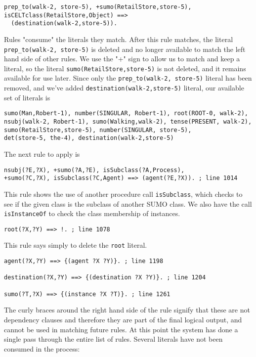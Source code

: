 \documentclass{book}
\begin{document}
\begin{verbatim}
prep_to(walk-2, store-5), +sumo(RetailStore,store-5), 
isCELTclass(RetailStore,Object) ==> 
  (destination(walk-2,store-5)). 
\end{verbatim}

Rules "consume" the literals they match.  After this rule matches, the literal
\texttt{prep\_to(walk-2, store-5)} is deleted and no longer available to 
match the left hand side of other rules.  We use the "+" sign to allow us
to match and keep a literal, so the literal \texttt{sumo(RetailStore,store-5)} 
is not deleted, and it remains available for use later.  Since only the
\texttt{prep\_to(walk-2, store-5)} literal
has been removed, and we've added \texttt{destination(walk-2,store-5)} literal,
our available set of literals is

\begin{verbatim}
sumo(Man,Robert-1), number(SINGULAR, Robert-1), root(ROOT-0, walk-2), 
nsubj(walk-2, Robert-1), sumo(Walking,walk-2), tense(PRESENT, walk-2), 
sumo(RetailStore,store-5), number(SINGULAR, store-5), 
det(store-5, the-4), destination(walk-2,store-5)
\end{verbatim}

The next rule to apply is 

\begin{verbatim}
nsubj(?E,?X), +sumo(?A,?E), isSubclass(?A,Process), 
+sumo(?C,?X), isSubclass(?C,Agent) ==> (agent(?E,?X)). ; line 1014
\end{verbatim}

This rule shows the use of another procedure call \texttt{isSubclass},
which checks to see if the given class is the subclass of another
SUMO class.  We also have the call \texttt{isInstanceOf} to check the class 
membership of instances.
 
\begin{verbatim}
root(?X,?Y) ==> !. ; line 1078
\end{verbatim}

This rule says simply to delete the \texttt{root} literal.

\begin{verbatim}
agent(?X,?Y) ==> {(agent ?X ?Y)}. ; line 1198

destination(?X,?Y) ==> {(destination ?X ?Y)}. ; line 1204

sumo(?T,?X) ==> {(instance ?X ?T)}. ; line 1261
\end{verbatim}

The curly braces around the right hand side of the rule signify that these
are not dependency clauses and therefore they are part of the final
logical output, and cannot be used in matching future rules. At this point
the system has done a single pass through the entire list of rules.  
Several literals have not been consumed in the process:
\end{document}
